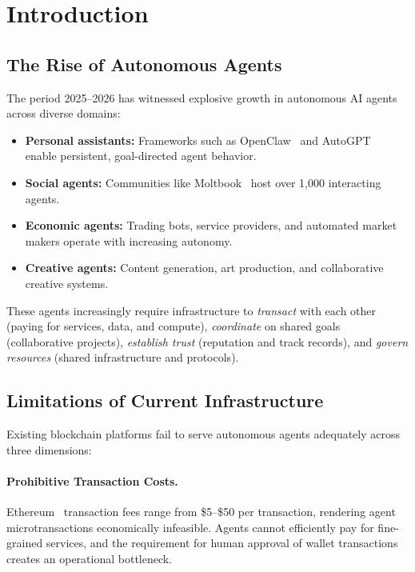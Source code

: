 
\section{Introduction}
\label{sec:introduction}

\subsection{The Rise of Autonomous Agents}

The period 2025--2026 has witnessed explosive growth in autonomous AI agents across diverse domains:

\begin{itemize}[nosep]
    \item \textbf{Personal assistants:} Frameworks such as OpenClaw~\citep{openclaw2025} and AutoGPT~\citep{autogpt2024} enable persistent, goal-directed agent behavior.
    \item \textbf{Social agents:} Communities like Moltbook~\citep{moltbook2025} host over 1{,}000 interacting agents.
    \item \textbf{Economic agents:} Trading bots, service providers, and automated market makers operate with increasing autonomy.
    \item \textbf{Creative agents:} Content generation, art production, and collaborative creative systems.
\end{itemize}

These agents increasingly require infrastructure to \emph{transact} with each other (paying for services, data, and compute), \emph{coordinate} on shared goals (collaborative projects), \emph{establish trust} (reputation and track records), and \emph{govern resources} (shared infrastructure and protocols).

\subsection{Limitations of Current Infrastructure}
\label{sec:limitations}

Existing blockchain platforms fail to serve autonomous agents adequately across three dimensions:

\paragraph{Prohibitive Transaction Costs.}
Ethereum~\citep{ethereum2014} transaction fees range from \$5--\$50 per transaction, rendering agent microtransactions economically infeasible. Agents cannot efficiently pay for fine-grained services, and the requirement for human approval of wallet transactions creates an operational bottleneck.

